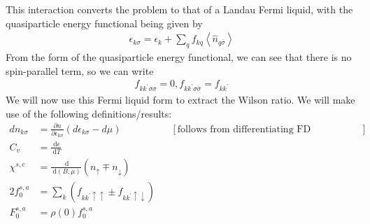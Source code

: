 \documentclass[12pt,twoside]{report}
\numberwithin{equation}{section}
\begin{document}
This interaction converts the problem to that of a Landau Fermi liquid, with the quasiparticle energy functional being given by
\begin{equation}\begin{aligned}
	\epsilon_{k\sigma} = \epsilon_k + \sum_{q}f_{kq}\left<\hat n_{q \overline\sigma}\right>
\end{aligned}\end{equation}
From the form of the quasiparticle energy functional, we can see that there is no spin-parallel term, so we can write
\begin{equation}\begin{aligned}
	\label{rel_landau}
	f_{kk^\prime\sigma\sigma} = 0,  f_{kk^\prime\sigma\overline\sigma} = f_{kk^\prime}
\end{aligned}\end{equation}
We will now use this Fermi liquid form to extract the Wilson ratio. We will make use of the following definitions/results:
\begin{equation}\begin{aligned}
	dn_{k\sigma} &= \frac{\partial{n}}{\partial{\epsilon_{k\sigma}}}\left( d\epsilon_{k\sigma} - d\mu \right) &&\left[\text{follows from differentiating FD distribution}\right] \\
	C_v &= \frac{\:\mathrm{d}\epsilon}{\:\mathrm{d}T}\\
	\chi^{s,c} &= \frac{\:\mathrm{d}}{\:\mathrm{d}(B, \mu)}\left(n_\uparrow \mp n_\downarrow\right) \\
	2f_0^{s,a} &= \sum_k\left(f_{kk^\prime \uparrow \uparrow} \pm f_{kk^\prime \uparrow \downarrow}\right)\\
	F_0^{s,a} &= \rho(0) f_0^{s,a}
\end{aligned}\end{equation}
\end{document}
